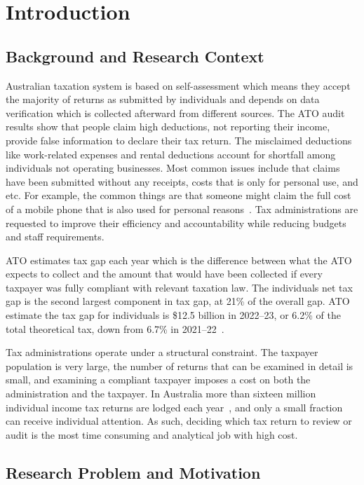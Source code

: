 \section{Introduction}

\subsection{Background and Research Context}

Australian taxation system is based on self-assessment which means they accept the majority of returns as submitted by individuals and depends on data verification which is collected afterward from different sources. The ATO audit results show that people claim high deductions, not reporting their income, provide false information to declare their tax return. The misclaimed deductions like work-related expenses and rental deductions account for shortfall among individuals not operating businesses. Most common issues include that claims have been submitted without any receipts, costs that is only for personal use, and etc. For example, the common things are that someone might claim the full cost of a mobile phone that is also used for personal reasons~\cite{oecd2016advanced}. Tax administrations are requested to improve their efficiency and accountability while reducing budgets and staff requirements.

ATO estimates tax gap each year which is the difference between what the ATO expects to collect and the amount that would have been collected if every taxpayer was fully compliant with relevant taxation law. The individuals net tax gap is the second largest component in tax gap, at 21\% of the overall gap. ATO estimate the tax gap for individuals is \$12.5 billion in 2022--23, or 6.2\% of the total theoretical tax, down from 6.7\% in 2021--22~\cite{ato2025taxgap}.

Tax administrations operate under a structural constraint. The taxpayer population is very large, the number of returns that can be examined in detail is small, and examining a compliant taxpayer imposes a cost on both the administration and the taxpayer. In Australia more than sixteen million individual income tax returns are lodged each year~\cite{oecd2016advanced}, and only a small fraction can receive individual attention. As such, deciding which tax return to review or audit is the most time consuming and analytical job with high cost.

\subsection{Research Problem and Motivation}

